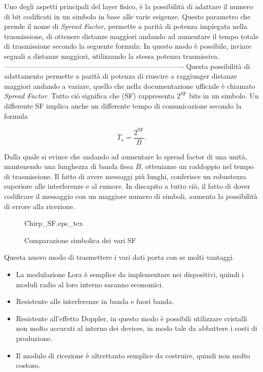 Uno degli aspetti principali del layer fisico, è la possibilità di adattare il
numero di bit codificati in un simbolo in base alle varie esigenze. 
Questo parametro che prende il nome di \emph{Spread Factor}, permette a parità
di potenza impiegata nella trasmissione, di ottenere distanze maggiori andando
ad aumentare il tempo totale di trasmissione secondo la seguente formula:
In questo modo è possibile, inviare segnali a distanze maggiori, utilizzando la
stessa potenza trasmissiva.
----------------------------------------------------------------------------
Questa
possibilità di adattamento permette a parità di potenza di
riuscire a raggiunger distanze maggiori andando a variare, quello che nella
documentazione ufficiale è chiamato \emph{Spread Factor}. Tutto ciò significa
che (SF) rappresenta $2^{\text{SF}}$ bits in un simbolo. Un differente SF
implica anche un differente tempo di comunicazione secondo la formula

\begin{equation}
        T_s=\frac{2^{\text{SF}}}{B}.
\end{equation}

Dalla quale si evince che andando ad aumentare lo spread factor di una unità,
mantenendo una lunghezza di banda fissa $B$, otteniamo un raddoppio nel tempo di
trasmissione. Il fatto di avere messaggi più lunghi, conferisce un robustezza
superiore alle interferenze e al rumore. In discapito a tutto ciò, il fatto di
dover codificare il messaggio con un maggiore numero di simboli, aumenta la
possibilità di errore alla ricezione. 

\begin{figure}[h]
\centering 
{Chirp_SF.eps_tex}
\caption{Comparazione simbolica dei vari SF}
\end{figure}

Questa nuovo modo di trasmettere i vari dati porta con se molti vantaggi.
\begin{itemize}
\item La modulazione Lora è semplice da implementare nei dispositivi, quindi i
moduli radio al loro interno saranno economici.
\item Resistente alle interferenze in banda e fuori banda.
\item Resistente  all'effetto Doppler, in questo modo è possibili utilizzare
cristalli non molto accurati al interno dei devices, in modo tale da abbattere i
costi di produzione.
\item Il modulo di ricezione è altrettanto semplice da costruire, quindi non
molto costoso.
\end{itemize}

